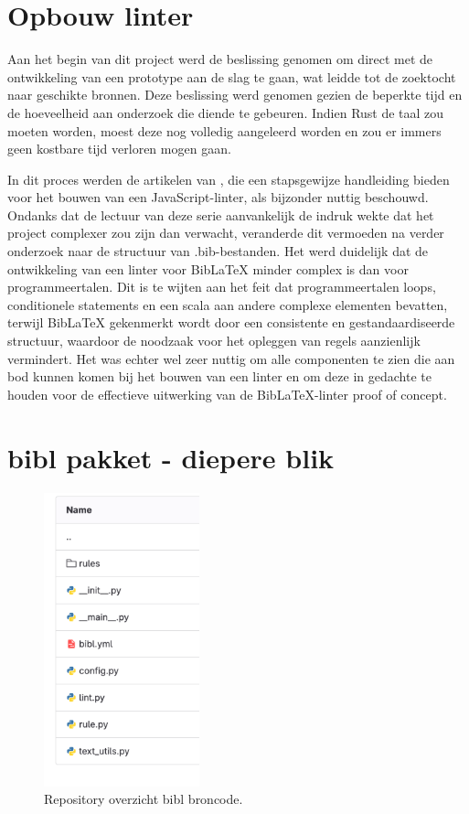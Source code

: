 \section{Opbouw linter}
Aan het begin van dit project werd de beslissing genomen om direct met de ontwikkeling van een prototype aan de slag te gaan, wat leidde tot de zoektocht naar geschikte bronnen. Deze beslissing werd genomen gezien de beperkte tijd en de hoeveelheid aan onderzoek die diende te gebeuren. Indien Rust de taal zou moeten worden, moest deze nog volledig aangeleerd worden en zou er immers geen kostbare tijd verloren mogen gaan.

In dit proces werden de artikelen van \textcite{BorgesLate2021}, die een stapsgewijze handleiding bieden voor het bouwen van een JavaScript-linter, als bijzonder nuttig beschouwd. Ondanks dat de lectuur van deze serie aanvankelijk de indruk wekte dat het project complexer zou zijn dan verwacht, veranderde dit vermoeden na verder onderzoek naar de structuur van .bib-bestanden. Het werd duidelijk dat de ontwikkeling van een linter voor BibLaTeX minder complex is dan voor programmeertalen. Dit is te wijten aan het feit dat programmeertalen loops, conditionele statements en een scala aan andere complexe elementen bevatten, terwijl BibLaTeX gekenmerkt wordt door een consistente en gestandaardiseerde structuur, waardoor de noodzaak voor het opleggen van regels aanzienlijk vermindert. Het was echter wel zeer nuttig om alle componenten te zien die aan bod kunnen komen bij het bouwen van een linter en om deze in gedachte te houden voor de effectieve uitwerking van de BibLaTeX-linter proof of concept.


\section{bibl pakket - diepere blik}
\label{sec:bibl-in-depth}
\begin{figure}[ht]
    \centering
    \includegraphics[width=0.4\textwidth]{./files/bibl_src.png}
    \caption[bibl repository - source code]{Repository overzicht bibl broncode.}
    \label{fig:bibl_src}
\end{figure}

